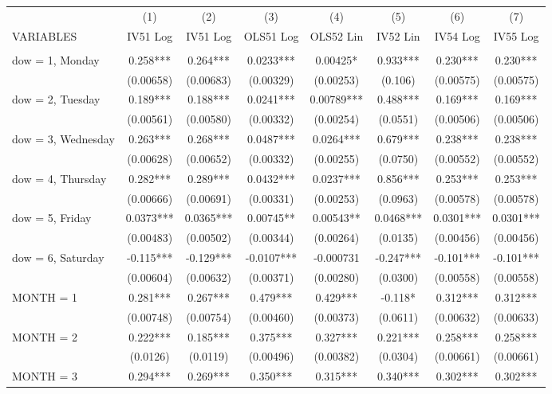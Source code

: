 \begin{tabular}{lccccccc} \hline
 & (1) & (2) & (3) & (4) & (5) & (6) & (7) \\
VARIABLES & IV51 Log & IV51 Log & OLS51 Log & OLS52 Lin & IV52 Lin & IV54 Log & IV55 Log \\ \hline
 &  &  &  &  &  &  &  \\
dow = 1, Monday & 0.258*** & 0.264*** & 0.0233*** & 0.00425* & 0.933*** & 0.230*** & 0.230*** \\
 & (0.00658) & (0.00683) & (0.00329) & (0.00253) & (0.106) & (0.00575) & (0.00575) \\
dow = 2, Tuesday & 0.189*** & 0.188*** & 0.0241*** & 0.00789*** & 0.488*** & 0.169*** & 0.169*** \\
 & (0.00561) & (0.00580) & (0.00332) & (0.00254) & (0.0551) & (0.00506) & (0.00506) \\
dow = 3, Wednesday & 0.263*** & 0.268*** & 0.0487*** & 0.0264*** & 0.679*** & 0.238*** & 0.238*** \\
 & (0.00628) & (0.00652) & (0.00332) & (0.00255) & (0.0750) & (0.00552) & (0.00552) \\
dow = 4, Thursday & 0.282*** & 0.289*** & 0.0432*** & 0.0237*** & 0.856*** & 0.253*** & 0.253*** \\
 & (0.00666) & (0.00691) & (0.00331) & (0.00253) & (0.0963) & (0.00578) & (0.00578) \\
dow = 5, Friday & 0.0373*** & 0.0365*** & 0.00745** & 0.00543** & 0.0468*** & 0.0301*** & 0.0301*** \\
 & (0.00483) & (0.00502) & (0.00344) & (0.00264) & (0.0135) & (0.00456) & (0.00456) \\
dow = 6, Saturday & -0.115*** & -0.129*** & -0.0107*** & -0.000731 & -0.247*** & -0.101*** & -0.101*** \\
 & (0.00604) & (0.00632) & (0.00371) & (0.00280) & (0.0300) & (0.00558) & (0.00558) \\
MONTH = 1 & 0.281*** & 0.267*** & 0.479*** & 0.429*** & -0.118* & 0.312*** & 0.312*** \\
 & (0.00748) & (0.00754) & (0.00460) & (0.00373) & (0.0611) & (0.00632) & (0.00633) \\
MONTH = 2 & 0.222*** & 0.185*** & 0.375*** & 0.327*** & 0.221*** & 0.258*** & 0.258*** \\
 & (0.0126) & (0.0119) & (0.00496) & (0.00382) & (0.0304) & (0.00661) & (0.00661) \\
MONTH = 3 & 0.294*** & 0.269*** & 0.350*** & 0.315*** & 0.340*** & 0.302*** & 0.302*** \\

\end{tabular}
